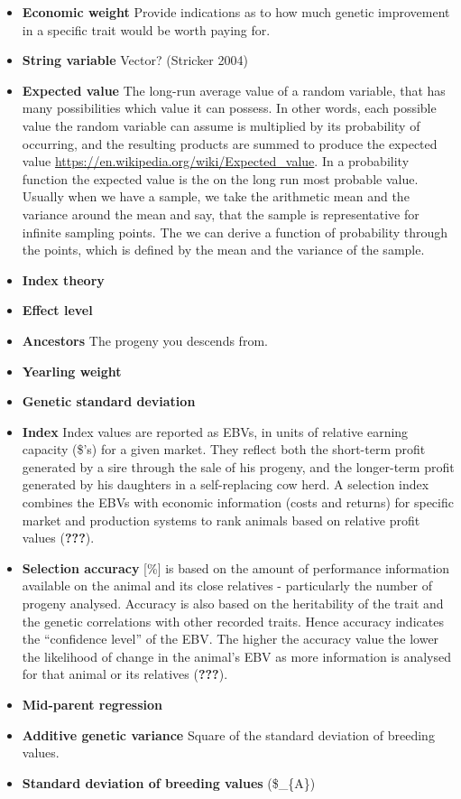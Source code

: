 \documentclass[]{article}
\begin{document}
\begin{itemize}
\item
  \textbf{Economic weight} Provide indications as to how much genetic
  improvement in a specific trait would be worth paying for.
\item
  \textbf{String variable} Vector? (Stricker 2004)
\item
  \textbf{Expected value} The long-run average value of a random
  variable, that has many possibilities which value it can possess. In
  other words, each possible value the random variable can assume is
  multiplied by its probability of occurring, and the resulting products
  are summed to produce the expected value
  \url{https://en.wikipedia.org/wiki/Expected_value}. In a probability
  function the expected value is the on the long run most probable
  value. Usually when we have a sample, we take the arithmetic mean and
  the variance around the mean and say, that the sample is
  representative for infinite sampling points. The we can derive a
  function of probability through the points, which is defined by the
  mean and the variance of the sample.
\item
  \textbf{Index theory}
\item
  \textbf{Effect level}
\item
  \textbf{Ancestors} The progeny you descends from.
\item
  \textbf{Yearling weight}
\item
  \textbf{Genetic standard deviation}
\item
  \textbf{Index} Index values are reported as EBVs, in units of relative
  earning capacity (\$'s) for a given market. They reflect both the
  short-term profit generated by a sire through the sale of his progeny,
  and the longer-term profit generated by his daughters in a
  self-replacing cow herd. A selection index combines the EBVs with
  economic information (costs and returns) for specific market and
  production systems to rank animals based on relative profit values
  ({\textbf{???}}).
\item
  \textbf{Selection accuracy} {[}\%{]} is based on the amount of
  performance information available on the animal and its close
  relatives - particularly the number of progeny analysed. Accuracy is
  also based on the heritability of the trait and the genetic
  correlations with other recorded traits. Hence accuracy indicates the
  ``confidence level'' of the EBV. The higher the accuracy value the
  lower the likelihood of change in the animal's EBV as more information
  is analysed for that animal or its relatives ({\textbf{???}}).
\item
  \textbf{Mid-parent regression}
\item
  \textbf{Additive genetic variance} Square of the standard deviation of
  breeding values.
\item
  \textbf{Standard deviation of breeding values} (\$\sigma\_\{A\})
\end{itemize}
\end{document}
